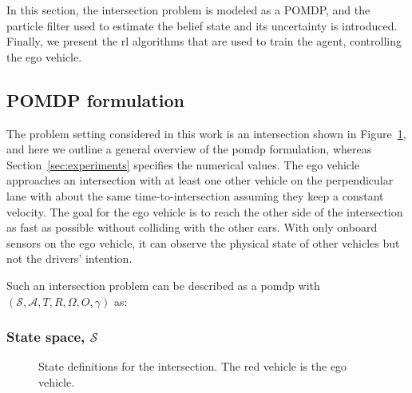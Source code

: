 In this section, the intersection problem is modeled as a POMDP, and the particle filter used to estimate the belief state and its uncertainty is introduced. Finally, we present the \gls{rl} algorithms that are used to train the agent, controlling the ego vehicle.

\subsection{POMDP formulation}
\label{sec:pomdp_formulation}

The problem setting considered in this work is an intersection shown in Figure~\ref{fig:states}, and here we outline a general overview of the \gls{pomdp} formulation, whereas Section~\ref{sec:experiments} specifies the numerical values. 
The ego vehicle approaches an intersection with at least one other vehicle on the perpendicular lane with about the same time-to-intersection assuming they keep a constant velocity. The goal for the ego vehicle is to reach the other side of the intersection as fast as possible without colliding with the other cars. With only onboard sensors on the ego vehicle, it can observe the physical state of other vehicles but not the drivers' intention. 

Such an intersection problem can be described as a \gls{pomdp} with \\ $(\mathcal{S},\mathcal{A},T,R,\Omega,O,\gamma)$ as:

\subsubsection{State space, $\mathcal{S}$}
\begin{figure}[!t]
    \centering
        
        \caption{State definitions for the intersection. The red vehicle is the ego vehicle.}
    \label{fig:states}
\end{figure}
%         
%         

